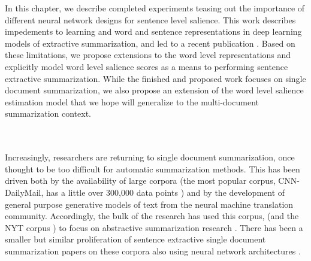 In this chapter, we describe completed experiments teasing out the importance
of different neural network designs for sentence level salience. This
work describes impedements to learning and word and sentence representations
in deep learning models of extractive summarization, and led to 
a recent publication \citep{kedzie2018deep}. Based on these limitations,
we propose extensions to the word level representations and explicitly model
word level salience scores as a means to performing sentence extractive
summarization. While the finished and proposed work focuses on single document
summarization, we also propose an extension of the word level salience
estimation model that we hope will generalize to the multi-document
summarization context.




~~\\
~\\






Increasingly, researchers are returning to single document summarization,
once thought to be too difficult for automatic summarization methods.
This has been driven both by the availability of large corpora (the
most popular corpus, CNN-DailyMail, has a little over 300,000 data points
\citep{see2017get}) and by the development of general purpose 
generative models of text from the neural machine translation community.
Accordingly, the bulk of the research has used this corpus, (and the NYT
corpus \citep{sandhaus2008new}) to focus on abstractive summarization
research \citep{rush2015neural,chopra2016abstractive,cheng2016neural,nallapati2016abstractive,see2017get,paulus2017deep}. 
There has been a smaller but similar proliferation of sentence
extractive single document summarization papers on these corpora also using 
neural network architectures \citep{cheng2016neural,nallapati2016classify,nallapati2016abstractive,narayan2018ranking}.


